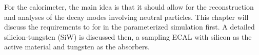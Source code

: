 
For the calorimeter, 
the main idea is that it should allow for the reconstruction and analyses of the decay modes involving neutral particles.
This chapter will discuss the requirements to \ecal for \upgradetwo in the parameterized simulation first.
A detailed silicion-tungsten (SiW) \ecal is discussed then, 
\ie a sampling ECAL with silicon as the active material and tungsten as the absorbers.







